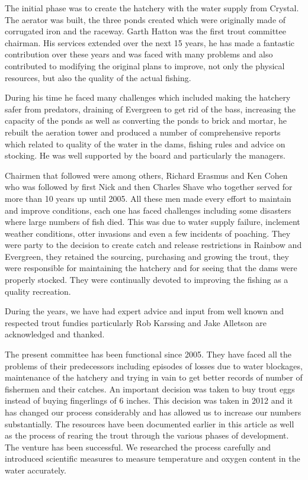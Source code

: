 The initial phase was to create the hatchery with the water supply from Crystal. The aerator was built, the three ponds created 
which were originally made of corrugated iron and the raceway. Garth Hatton was the first trout committee chairman. 
His services extended over the next 15 years, he has made a fantastic contribution over these years and was 
faced with many problems and also contributed to modifying the original plans to improve, not only the physical resources, 
but also the quality of the actual fishing. 

During his time he faced many challenges which included making the hatchery safer from predators, 
draining of Evergreen to get rid of the bass, increasing the capacity of the ponds as well as converting the ponds to brick and mortar, 
he rebuilt the aeration tower and produced a number of comprehensive reports which related to quality of the water in the dams, 
fishing rules and advice on stocking. He was well supported by the board and particularly the managers.

Chairmen that followed were among others, Richard Erasmus and Ken Cohen who was followed by 
first Nick and then Charles Shave who together served for more than 10 years up until 2005. 
All these men made every effort to maintain and improve conditions, each one has faced challenges including 
some disasters where large numbers of fish died. 
This was due to water supply failure, inclement weather conditions, otter invasions and even a few incidents of poaching. 
They were party to the decision to create catch and release restrictions in Rainbow and Evergreen, 
they retained the sourcing, purchasing and growing the trout, they were responsible for maintaining the hatchery 
and for seeing that the dams were properly stocked. They were continually devoted to improving the fishing as a quality recreation.

During the years, we have had expert advice and input from well known and respected trout fundies particularly 
Rob Karssing and Jake Alletson are acknowledged and thanked.

The present committee has been functional since 2005. They have faced all the problems of their predecessors 
including episodes of losses due to water blockages, maintenance of the hatchery and trying in vain to 
get better records of number of fishermen and their catches. An important decision was taken to buy trout eggs 
instead of buying fingerlings of 6 inches. This decision was taken in 2012 and it has changed our process 
considerably and has allowed us to increase our numbers substantially. The resources have been documented 
earlier in this article as well as the process of rearing the trout through the various phases of development. 
The venture has been successful.  We researched the process carefully and introduced scientific measures to 
measure temperature and oxygen content in the water accurately. 

